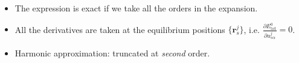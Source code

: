 \begin{frame}
  \begin{itemize}
  \item The expression is exact if we take all the orders in the expansion.
  \item All the derivatives are taken at the equilibrium positions
    $\{\boldsymbol{r}^j_s\}$, i.e. $
    \frac{
      \partial E^0_{\text{tot}}
    }{
      \partial
      {u}_{s\alpha}^j
    }=0$. 
  \item Harmonic approximation: truncated at \emph{second} order.
  \end{itemize}
\end{frame}
